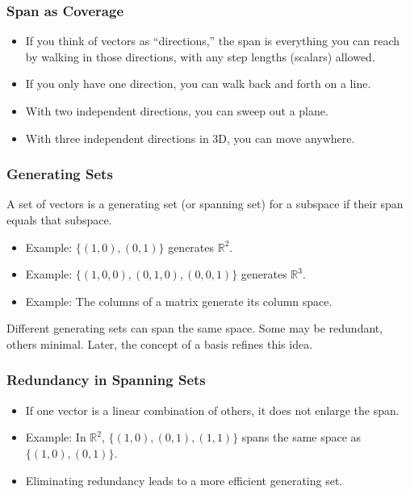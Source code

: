 \documentclass[
  letterpaper,
  DIV=11,
  numbers=noendperiod]{scrreprt}
\providecommand{\tightlist}{%
  \setlength{\itemsep}{0pt}\setlength{\parskip}{0pt}}
\begin{document}
\subsubsection{Span as Coverage}\label{span-as-coverage}

\begin{itemize}
\tightlist
\item
  If you think of vectors as ``directions,'' the span is everything you
  can reach by walking in those directions, with any step lengths
  (scalars) allowed.
\item
  If you only have one direction, you can walk back and forth on a line.
\item
  With two independent directions, you can sweep out a plane.
\item
  With three independent directions in 3D, you can move anywhere.
\end{itemize}

\subsubsection{Generating Sets}\label{generating-sets}

A set of vectors is a generating set (or spanning set) for a subspace if
their span equals that subspace.

\begin{itemize}
\tightlist
\item
  Example: \(\{(1,0), (0,1)\}\) generates \(\mathbb{R}^2\).
\item
  Example: \(\{(1,0,0), (0,1,0), (0,0,1)\}\) generates \(\mathbb{R}^3\).
\item
  Example: The columns of a matrix generate its column space.
\end{itemize}

Different generating sets can span the same space. Some may be
redundant, others minimal. Later, the concept of a basis refines this
idea.

\subsubsection{Redundancy in Spanning
Sets}\label{redundancy-in-spanning-sets}

\begin{itemize}
\tightlist
\item
  If one vector is a linear combination of others, it does not enlarge
  the span.
\item
  Example: In \(\mathbb{R}^2\), \(\{(1,0), (0,1), (1,1)\}\) spans the
  same space as \(\{(1,0), (0,1)\}\).
\item
  Eliminating redundancy leads to a more efficient generating set.
\end{itemize}
\end{document}
